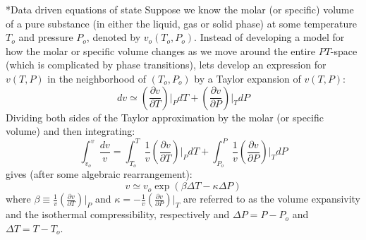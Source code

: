 \documentclass[11pt]{article}
\makeatletter
\theoremstyle{definition}
\renewcommand\subsubsection{\@startsection
	{subsubsection}{2}{0mm}
	{-0.05in}
	{-0.5\baselineskip}
	{\normalfont\normalsize\bfseries}}
\makeatother
\begin{document}
\subsubsection*{Data driven equations of state}
Suppose we know the molar (or specific) volume of a pure substance (in either the liquid, gas or solid phase) at some temperature $T_{o}$ and pressure $P_{o}$, denoted by $v_{o}(T_{o},P_{o})$.
Instead of developing a model for how the molar or specific volume changes as we move around the entire $PT$-space (which is complicated by phase transitions), lets develop an expression for $v(T,P)$ in the neighborhood of $(T_{o},P_{o})$ by a Taylor expansion of $v(T,P)$:
\begin{equation}
  \displaystyle dv \simeq \left(\frac{\partial v}{\partial T}\right)\Bigr|_{P}dT + \left(\frac{\partial v}{\partial P}\right)\Bigr|_{T}dP
\end{equation}
Dividing both sides of the Taylor approximation by the molar (or specific volume) and then integrating:
\begin{equation}
  \displaystyle \int_{v_{o}}^{v}\frac{dv}{v} = \int_{T_{o}}^{T} \frac{1}{v}\left(\frac{\partial v}{\partial T}\right)\Bigr|_{P}dT+\int_{P_{o}}^{P}\frac{1}{v}\left(\frac{\partial v}{\partial P}\right)\Bigr|_{T}dP
\end{equation}
gives (after some algebraic rearrangement):
\begin{equation}
\displaystyle v \simeq v_{o}\exp\left(\beta\Delta{T}-\kappa\Delta{P}\right)
\end{equation}
where $\beta\equiv\frac{1}{v}\left(\frac{\partial v}{\partial T}\right)\Bigr|_{P}$ and $\kappa = -\frac{1}{v}\left(\frac{\partial v}{\partial P}\right)\Bigr|_{T}$ are referred to as the volume expansivity and the isothermal compressibility,
respectively and $\Delta{P}=P-P_{o}$ and $\Delta{T}=T-T_{o}$.

\clearpage
\end{document}
